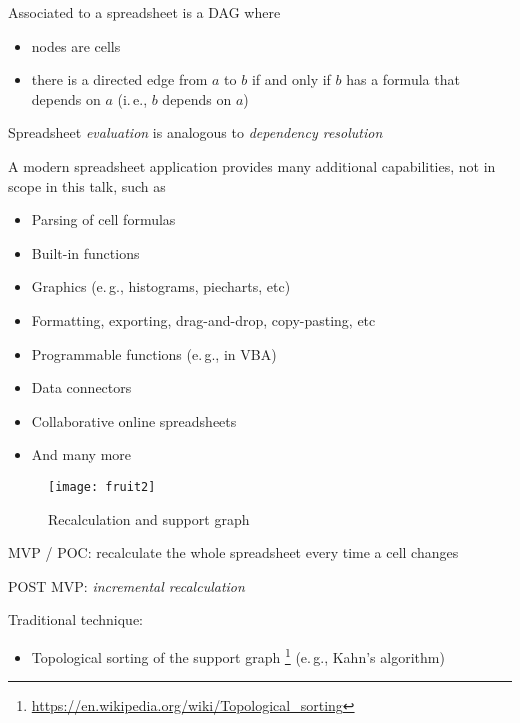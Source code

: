 \documentclass[10pt]{beamer}
\providecommand{\ie}{i.\,e.}
\providecommand{\eg}{e.\,g.}
\begin{document}
\begin{frame}[fragile]
 Associated to a spreadsheet is a DAG where
  \begin{itemize}
    \item nodes are cells
    \item there is a directed edge from $a$ to $b$ if and only if $b$ has a formula that depends on $a$ (\ie, $b$ depends on $a$)
  \end{itemize}

\end{frame}

\begin{frame}[fragile]
  Spreadsheet \emph{evaluation} is analogous to \emph{dependency resolution}
 \end{frame}

\begin{frame}[fragile]
  A modern spreadsheet application provides many additional capabilities, not in scope in this talk, such as
  \begin{itemize}
    \item Parsing of cell formulas
    \item Built-in functions
    \item Graphics (\eg, histograms, piecharts, etc) 
    \item Formatting, exporting, drag-and-drop, copy-pasting, etc
    \item Programmable functions (\eg, in VBA) 
    \item Data connectors 
    \item Collaborative online spreadsheets
    \item And many more
  \end{itemize}
\end{frame}


\begin{frame}[fragile]
  \begin{figure}
    \centering
    \texttt{[image: fruit2]}
    \caption{Recalculation and support graph}
  \end{figure}
\end{frame}

\begin{frame}[fragile]
  MVP / POC: recalculate the whole spreadsheet every time a cell changes
\end{frame}

\begin{frame}[fragile]
  POST MVP: \emph{incremental recalculation}

  Traditional technique:
  \begin{itemize}
    \item Topological sorting of the support graph%
  \footnote{\url{https://en.wikipedia.org/wiki/Topological_sorting}}
      (\eg, Kahn's algorithm)
  \end{itemize}
\end{frame}
\end{document}
